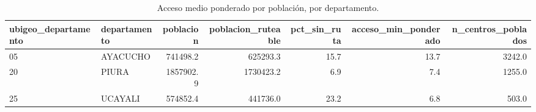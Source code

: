 \begin{table}
\caption{Acceso medio ponderado por población, por departamento.}
\label{tab:acceso-dep}
\begin{tabular}{llrrrrr}
\toprule
ubigeo\_departamento & departamento & poblacion & poblacion\_ruteable & pct\_sin\_ruta & acceso\_min\_ponderado & n\_centros\_poblados \\
\midrule
05 & AYACUCHO & 741498.2 & 625293.3 & 15.7 & 13.7 & 3242.0 \\
20 & PIURA & 1857902.9 & 1730423.2 & 6.9 & 7.4 & 1255.0 \\
25 & UCAYALI & 574852.4 & 441736.0 & 23.2 & 6.8 & 503.0 \\
\bottomrule
\end{tabular}
\end{table}
